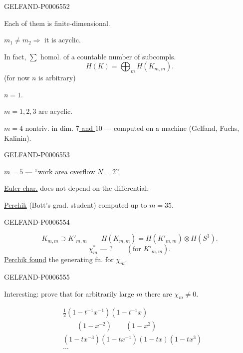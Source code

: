 \begin{GelfandAdjacentEvidence}{GELFAND-P000655}{2}


Each of them is finite-dimensional.

\(m_1\ne m_2\Longrightarrow\) it is acyclic.

In fact, \(\sum\) homol. of a countable number of subcompls.
\[
H(K)=\bigoplus_m H(K_{m,m}).
\]
(for now \(n\) is arbitrary)

\underline{\(n=1\)}.

\(m=1,2,3\) are acyclic.

\underline{\(m=4\)} nontriv. in dim. \underline{\(7\) and \(10\)}
--- computed on a machine (Gelfand, Fuchs, Kalinin).
\end{GelfandAdjacentEvidence}
\begin{GelfandAdjacentEvidence}{GELFAND-P000655}{3}


\underline{\(m=5\)} --- “work area overflow \(N=2\)”.

\underline{Euler char.} does not depend on the differential.

\underline{Perchik} (Bott’s grad. student) computed up to \underline{\underline{\(m=35\)}}.
\end{GelfandAdjacentEvidence}
\begin{GelfandAdjacentEvidence}{GELFAND-P000655}{4}

\[
K_{m,m}\supset K'_{m,m}\qquad
H(K_{m,m})=H(K'_{m,m})\otimes H(S^3).
\]
\[
\chi_m^*\text{ --- ?}\qquad(\text{for }K'_{m,m}).
\]
\underline{Perchik found} the generating fn. for \(\chi_m\).
\end{GelfandAdjacentEvidence}
\begin{GelfandAdjacentEvidence}{GELFAND-P000655}{5}


Interesting: prove that for arbitrarily large \(m\) there are \(\chi_m\ne0\).
\end{GelfandAdjacentEvidence}

\[
\begin{aligned}
&\tfrac12(1-t^{-1}x^{-1})(1-t^{-1}x)\\
&\qquad (1-x^{-2})\qquad (1-x^2)\\
&(1-tx^{-3})(1-tx^{-1})(1-tx)(1-tx^3)\\
&\ldots
\end{aligned}
\]


